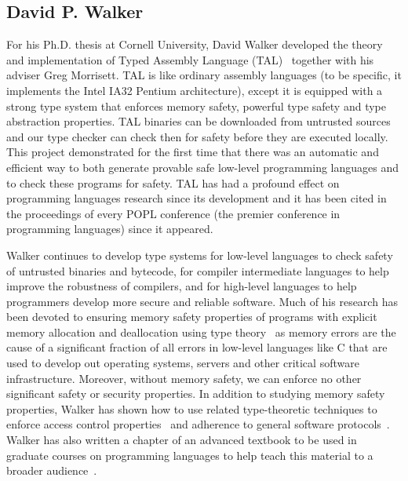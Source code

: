 \subsection{David P. Walker}

For his Ph.D. thesis at Cornell University, David Walker developed the
theory and implementation of Typed Assembly Language
(TAL)~\cite{morrisett+:tal-popl,morrisett+:tal,morrisett+:journal-stal}
together with his adviser Greg Morrisett.  TAL is like ordinary
assembly languages (to be specific, it implements the Intel IA32
Pentium architecture), except it is equipped with a strong type system
that enforces memory safety, powerful type safety and type abstraction
properties.  TAL binaries can be downloaded from untrusted sources and
our type checker can check then for safety before they are executed
locally.  This project demonstrated for the first time that there was
an automatic and efficient way to both generate provable safe
low-level programming languages and to check these programs for
safety.  TAL has had a profound effect on programming languages
research since its development and it has been cited in the
proceedings of every POPL conference (the premier conference in
programming languages) since it appeared.

Walker continues to develop type systems for low-level languages to check
safety of untrusted binaries and bytecode, for compiler intermediate
languages to help improve the robustness of compilers, and for
high-level languages to help programmers develop more secure and
reliable software.  Much of his research has been devoted to ensuring
memory safety properties of programs with explicit memory allocation
and deallocation using type
theory~\cite{crary+:capabilities,walker+:capabilities,smith+:alias-types,walker:thesis,ahmed+:hierarchical-storage}
as memory errors are the cause of a significant fraction of all errors
in low-level languages like C that are used to develop out operating
systems, servers and other critical software infrastructure.
Moreover, without memory safety, we can enforce no other significant
safety or security properties.  In addition to studying memory safety
properties, Walker has shown how to use related type-theoretic techniques
to enforce access control properties~\cite{walker:security} and
adherence to general software
protocols~\cite{mandelbaum+:refinements}.  Walker has also written a
chapter of an advanced textbook to be used in graduate courses on
programming languages to help teach this material to a broader
audience~\cite{walker:attapl}.

